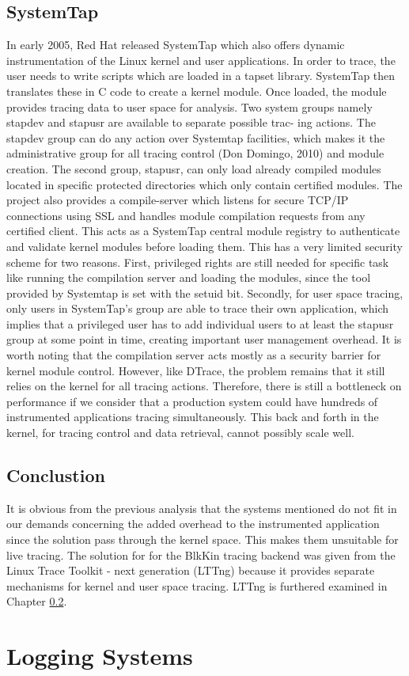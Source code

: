 \subsection{SystemTap}
In early 2005, Red Hat released SystemTap \cite{systemtap} which also
offers dynamic instrumentation of the Linux kernel and user applications. In
order to trace, the user needs to write scripts which are loaded in a tapset
library. SystemTap then translates these in C code to create a kernel module.
Once loaded, the module provides tracing data to user space for analysis.
Two system groups namely stapdev and stapusr are available to separate possible
trac- ing actions. The stapdev group can do any action over Systemtap
facilities, which makes it the administrative group for all tracing control (Don
Domingo, 2010) and module creation.
The second group, stapusr, can only load already compiled modules located in
specific protected directories which only contain certified modules.
The project also provides a compile-server which listens for secure TCP/IP
connections using SSL and handles module compilation requests from any certified
client. This acts as a SystemTap central module registry to authenticate and
validate kernel modules before loading them.
This has a very limited security scheme for two reasons. First, privileged
rights are still needed for specific task like running the compilation server
and loading the modules, since the tool provided by Systemtap is set with the
setuid bit. Secondly, for user space tracing, only users in SystemTap’s group
are able to trace their own application, which implies that a privileged user
has to add individual users to at least the stapusr group at some point in time,
creating important user management overhead.
It is worth noting that the compilation server acts mostly as a security barrier
for kernel module control. However, like DTrace, the problem remains that it
still relies on the kernel for all tracing actions. Therefore, there is still a
bottleneck on performance if we consider that a production system could have
hundreds of instrumented applications tracing simultaneously. This back and
forth in the kernel, for tracing control and data retrieval, cannot possibly
scale well.

\subsection{Conclustion}
It is obvious from the previous analysis that the systems mentioned do not fit
in our demands concerning the added overhead to the instrumented application
since the solution pass through the kernel space. This makes them unsuitable for
live tracing. The solution for for the BlkKin tracing backend was given from the
Linux Trace Toolkit - next generation (LTTng) because it provides separate
mechanisms for kernel and user space tracing. LTTng is furthered examined in
Chapter \ref{}.   

\section{Logging Systems}\label{sec:logging-bkg}
